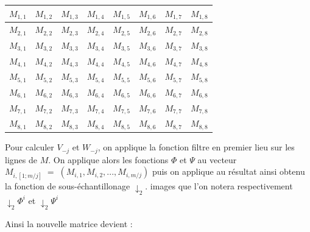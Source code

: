 \documentclass[a4paper,10pt]{report}
\theoremstyle{break}
\begin{document}
	\begin{center}
	
	  \begin{tabular}{| c | c | c | c | c | c | c | c |}
	      \hline
	      $M_{1,1}$ & $M_{1,2}$ & $M_{1,3}$ & $M_{1,4}$ & $M_{1,5}$ & $M_{1,6}$ & $M_{1,7}$ & $M_{1,8}$ \\ 
	      \hline
	      $M_{2,1}$ & $M_{2,2}$ & $M_{2,3}$ & $M_{2,4}$ & $M_{2,5}$ & $M_{2,6}$ & $M_{2,7}$ & $M_{2,8}$ \\ 
	      \hline
	      $M_{3,1}$ & $M_{3,2}$ & $M_{3,3}$ & $M_{3,4}$ & $M_{3,5}$ & $M_{3,6}$ & $M_{3,7}$ & $M_{3,8}$ \\ 
	      \hline
	      $M_{4,1}$ & $M_{4,2}$ & $M_{4,3}$ & $M_{4,4}$ & $M_{4,5}$ & $M_{4,6}$ & $M_{4,7}$ & $M_{4,8}$ \\ 
	      \hline
	      $M_{5,1}$ & $M_{5,2}$ & $M_{5,3}$ & $M_{5,4}$ & $M_{5,5}$ & $M_{5,6}$ & $M_{5,7}$ & $M_{5,8}$ \\ 
	      \hline
	      $M_{6,1}$ & $M_{6,2}$ & $M_{6,3}$ & $M_{6,4}$ & $M_{6,5}$ & $M_{6,6}$ & $M_{6,7}$ & $M_{6,8}$ \\ 
	      \hline
	      $M_{7,1}$ & $M_{7,2}$ & $M_{7,3}$ & $M_{7,4}$ & $M_{7,5}$ & $M_{7,6}$ & $M_{7,7}$ & $M_{7,8}$ \\ 
	      \hline
	      $M_{8,1}$ & $M_{8,2}$ & $M_{8,3}$ & $M_{8,4}$ & $M_{8,5}$ & $M_{8,6}$ & $M_{8,7}$ & $M_{8,8}$ \\  
	      \hline
	  \end{tabular}
	 
	\end{center}
	
	Pour calculer $V_{-j}$ et $W_{-j}$, on applique la fonction filtre en premier lieu sur les lignes de $M$. \newline
	On applique alors les fonctions $ \varPhi $ et $\varPsi$ au vecteur $ M_{i,[1;m/j]} \; = \; (M_{i,1}, M_{i,2}, ..., M_{i, m/j}) $ 
	puis on applique au r\'{e}sultat ainsi obtenu la fonction de sous-\'{e}chantillonage $\downarrow_2$.
	images que l'on notera respectivement $\downarrow_2 \varPhi^i$ et $\downarrow_2 \varPsi^i$
	
\newpage

	Ainsi la nouvelle matrice devient :
	
\end{document}
